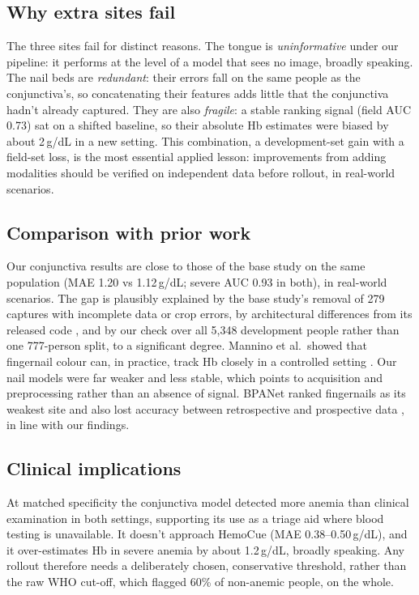 \documentclass[10pt,a4paper,twocolumn]{article}
\newcommand{\gdl}{\,g/dL}
\begin{document}
\subsection{Why extra sites fail}
The three sites fail for distinct reasons. The tongue is \emph{uninformative} under our pipeline: it performs at the level of a model that sees no image, broadly speaking. The nail beds are \emph{redundant}: their errors fall on the same people as the conjunctiva's, so concatenating their features adds little that the conjunctiva hadn't already captured. They are also \emph{fragile}: a stable ranking signal (field AUC 0.73) sat on a shifted baseline, so their absolute Hb estimates were biased by about 2\gdl{} in a new setting. This combination, a development-set gain with a field-set loss, is the most essential applied lesson: improvements from adding modalities should be verified on independent data before rollout, in real-world scenarios.

\subsection{Comparison with prior work}
Our conjunctiva results are close to those of the base study on the same population (MAE 1.20 vs 1.12\gdl; severe AUC 0.93 in both), in real-world scenarios. The gap is plausibly explained by the base study's removal of 279 captures with incomplete data or crop errors, by architectural differences from its released code \cite{googlecode}, and by our check over all 5,348 development people rather than one 777-person split, to a significant degree. Mannino et al.\ showed that fingernail colour can, in practice, track Hb closely in a controlled setting \cite{mannino2018}. Our nail models were far weaker and less stable, which points to acquisition and preprocessing rather than an absence of signal. BPANet ranked fingernails as its weakest site and also lost accuracy between retrospective and prospective data \cite{lin2025}, in line with our findings.

\subsection{Clinical implications}
At matched specificity the conjunctiva model detected more anemia than clinical examination in both settings, supporting its use as a triage aid where blood testing is unavailable. It doesn't approach HemoCue (MAE 0.38--0.50\gdl), and it over-estimates Hb in severe anemia by about 1.2\gdl, broadly speaking. Any rollout therefore needs a deliberately chosen, conservative threshold, rather than the raw WHO cut-off, which flagged 60\% of non-anemic people, on the whole.
\end{document}
